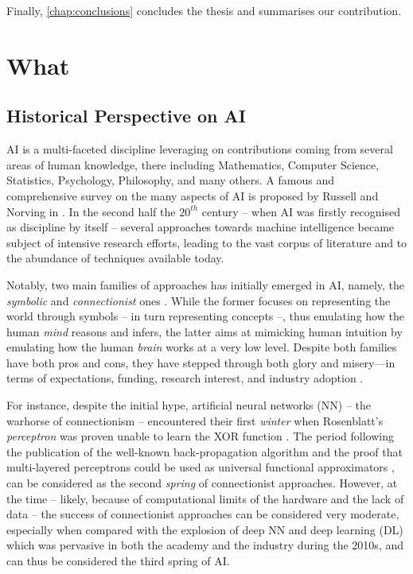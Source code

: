 \documentclass[12pt,a4paper,openright,twoside]{book}
\begin{document}
\emptysubparagraph

Finally, \cref{chap:conclusions} concludes the thesis and summarises our contribution.


\part{What}
\label{part:what}

\chapter{Historical Perspective on AI}
\label{chap:history}

AI is a multi-faceted discipline leveraging on contributions coming from several areas of human knowledge, there including Mathematics, Computer Science, Statistics, Psychology, Philosophy, and many others.
%
A famous and comprehensive survey on the many aspects of AI is proposed by Russell and Norving in \cite{russell2016artificial}.
%
In the second half the $20^{th}$ century -- when AI was firstly recognised as discipline by itself -- several approaches towards machine intelligence became subject of intensive research efforts, leading to the vast corpus of literature and to the abundance of techniques available today.

Notably, two main families of approaches has initially emerged in AI, namely, the \emph{symbolic} and \emph{connectionist} ones \cite{Smolensky1987, SUN2001783}.
%
While the former focuses on representing the world through symbols -- in turn representing concepts --, thus emulating how the human \emph{mind} reasons and infers, the latter aims at mimicking human intuition by emulating how the human \emph{brain} works at a very low level.
%
Despite both families have both pros and cons, they have stepped through both glory and misery---in terms of expectations, funding, research interest, and industry adoption \cite{Hendler2008, russell2016artificial}.

For instance, despite the initial hype, artificial neural networks (NN) -- the warhorse of connectionism -- encountered their first \emph{winter} when Rosenblatt's \emph{perceptron} \cite{rosenblatt1957perceptron} was proven unable to learn the XOR function \cite{Minsky1988}.
%
The period following the publication of the well-known back-propagation algorithm \cite{Rumelhart1986} and the proof that multi-layered perceptrons could be used as universal functional approximators \cite{Cybenko1989}, can be considered as the second \emph{spring} of connectionist approaches.
%
However, at the time -- likely, because of computational limits of the hardware and the lack of data -- the success of connectionist approaches can be considered very moderate, especially when compared with the explosion of deep NN and deep learning (DL) \cite{GoodfellowBC2016} which was pervasive in both the academy and the industry during the 2010s, and can thus be considered the third spring of AI.
\end{document}
